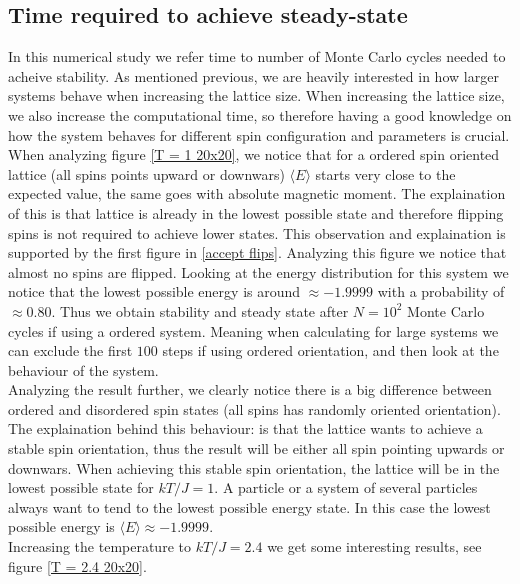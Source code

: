 \documentclass[a4paper, 10pt]{article}
\begin{document}
\subsection{Time required to achieve steady-state} In this numerical study we refer time to number of Monte Carlo cycles needed to acheive stability.
As mentioned previous, we are heavily interested in how larger systems behave when increasing the lattice size. When increasing the lattice size, we also increase the computational time,
so therefore having a good knowledge on how the system behaves for different spin configuration and parameters is crucial.
\vspace{3mm}
\\
When analyzing figure \eqref{T = 1 20x20}, we notice that for a ordered spin oriented lattice (all spins points upward or downwars)
$\langle E \rangle$ starts very close to the expected value, the same goes with absolute magnetic moment. The explaination of this is that lattice is already
in the lowest possible state and therefore flipping spins is not required to achieve lower states. This observation and explaination is
supported by the first figure in \eqref{accept flips}. Analyzing this figure we notice that almost no spins are flipped. Looking at the energy distribution
for this system we notice that the lowest possible energy is around $\approx -1.9999$ with a probability of $\approx 0.80$.
Thus we obtain stability and steady state after $N = 10^{2}$ Monte Carlo cycles if using a ordered system. Meaning when calculating for large systems we can exclude the first $100$ steps if using ordered orientation, and then
look at the behaviour of the system.
\vspace{3mm}
\\
Analyzing the result further, we clearly notice there is a big difference between ordered and disordered spin states (all spins has randomly oriented orientation).
The explaination behind this behaviour: is that the lattice wants to achieve a stable spin orientation, thus the result will be either all spin pointing upwards or downwars.
When achieving this stable spin orientation, the lattice will be in the lowest possible state for $kT/J = 1$. A particle or a system of several particles always want to tend to
the lowest possible energy state. In this case the lowest possible energy is $\langle E \rangle \approx -1.9999$.
\vspace{3mm}
\\
Increasing the temperature to $kT/J = 2.4$ we get some interesting results, see figure \eqref{T = 2.4 20x20}.
\end{document}
